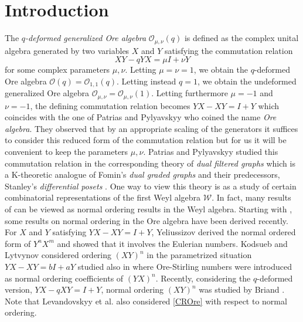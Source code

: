 \documentclass[10pt]{amsart}
\begin{document}
\section{Introduction}\label{Introduction}
The {\em $q$-deformed generalized Ore algebra} ${\mathcal O}_{\mu,\nu}(q)$ is defined as the complex unital algebra generated by two variables $X$ and $Y$ satisfying the commutation relation
\begin{equation}\label{CROre}
XY-qYX= \mu I + \nu Y
\end{equation}
for some complex parameters $\mu,\nu$. Letting $\mu=\nu=1$, we obtain the $q$-deformed Ore algebra ${\mathcal O}(q)={\mathcal O}_{1,1}(q)$. Letting instead  $q=1$, we obtain the undeformed generalized Ore algebra ${\mathcal O}_{\mu,\nu}={\mathcal O}_{\mu,\nu}(1)$. Letting furthermore $\mu=-1$ and $\nu=-1$, the defining commutation relation becomes $YX-XY=I+Y$ which coincides with the one of Patrias and Pylyavskyy \cite{PAPY2015,PAPY2018} who coined the name {\em Ore algebra}. They observed that by an appropriate scaling of the generators it suffices to consider this reduced form of the  commutation relation but for us it will be convenient to keep the parameters $\mu,\nu$. Patrias and Pylyavskyy \cite{PAPY2015,PAPY2018} studied this commutation relation in the corresponding theory of {\em dual filtered graphs} which is a K-theoretic analogue of Fomin's {\em dual graded graphs} \cite{SF1994,SF1995} and their predecessors, Stanley’s {\em differential posets} \cite{RS1988}. One way to view this theory is as a study of certain combinatorial representations of the first Weyl algebra ${\mathcal W}$. In fact, many results of \cite{SF1994,SF1995,RS1988} can be viewed as normal ordering results in the Weyl algebra. Starting with \cite{PAPY2015,PAPY2018}, some results on normal ordering in the Ore algebra have been derived recently. For $X$ and $Y$ satisfying $YX-XY=I+Y$, Yeliussizov \cite{DY2019} derived the normal ordered form of $Y^nX^m$ and showed that it involves the Eulerian numbers. Kodsueb and Lytvynov \cite{CKEL2025} considered ordering $(XY)^n$ in the parametrized situation $YX-XY=bI+aY$ studied also in \cite{TMMS2023} where Ore-Stirling numbers were introduced as normal ordering coefficients of $(YX)^n$. Recently, considering the $q$-deformed version, $YX-qXY=I+Y$, normal ordering $(XY)^n$ was studied by Briand \cite{Briand2025}. Note that Levandovskyy et al. \cite{LEKO2011} also considered \eqref{CROre} with respect to normal ordering. 
\end{document}
